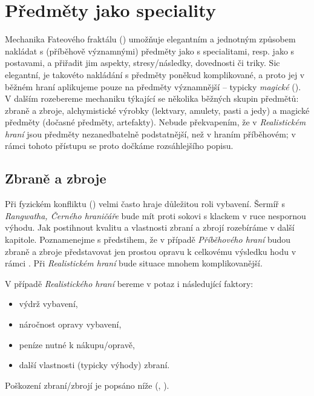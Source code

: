 \documentclass[../main.tex]{subfiles}
\begin{document}
\chapter{Předměty jako speciality}
\label{chap:magicke-spec-predmety}

Mechanika Fateového fraktálu () umožňuje elegantním a jednotným způsobem nakládat s (příběhově významnými) předměty jako s specialitami, resp. jako s postavami, a přiřadit jim aspekty, stresy/následky, dovednosti či triky. Sic elegantní, je takovéto nakládání s předměty poněkud komplikované, a proto jej v běžném hraní aplikujeme pouze na předměty významnější – typicky \emph{magické} (). V dalším rozebereme mechaniku týkající se několika běžných skupin předmětů: zbraně a zbroje, alchymistické výrobky (lektvary, amulety, pasti a jedy) a magické předměty (dočasné předměty, artefakty). Nebude překvapením, že v \emph{Realistickém hraní} jsou předměty nezanedbatelně podstatnější, než v hraním příběhovém; v rámci tohoto přístupu se proto dočkáme rozsáhlejšího popisu.

\section{Zbraně a zbroje}
\label{sec:zbrane-zbroje}
\renewcommand*{\predmetlist}{zbrane}%

Při fyzickém konfliktu () velmi často hraje důležitou roli vybavení. Šermíř s   \emph{Rangwatha, Černého hraničáře} bude mít proti sokovi s klackem v ruce nespornou výhodu. Jak postihnout kvalitu a vlastnosti zbraní a zbrojí rozebíráme v další kapitole. Poznamenejme s předstihem, že v případě \emph{Příběhového hraní} budou zbraně a zbroje představovat jen prostou opravu k celkovému výsledku hodu v rámci . Při  \emph{Realistickém hraní} bude situace mnohem komplikovanější.

\begin{Real}
	V případě \emph{Realistického hraní} bereme v potaz i následující faktory:
	\begin{itemize}
		\item výdrž vybavení,
		\item náročnost opravy vybavení,
		\item peníze nutné k nákupu/opravě,
		\item další vlastnosti (typicky výhody) zbraní.
	\end{itemize}
	Poškození zbraní/zbrojí je popsáno níže (, ).
\end{Real}
\end{document}
